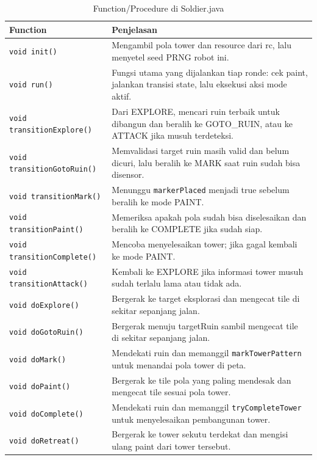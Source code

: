 \documentclass{article}
\begin{document}
\begin{enumerate}[label=\alph*.]
\begin{longtable}{|p{}|p{}|}
\caption{Function/Procedure di Soldier.java} \\
\hline
\textbf{Function} & \textbf{Penjelasan} \\
\hline
\endhead
\hline
\endfoot
\texttt{void init()} & Mengambil pola tower dan resource dari rc, lalu menyetel seed PRNG robot ini. \\
\hline
\texttt{void run()} & Fungsi utama yang dijalankan tiap ronde: cek paint, jalankan transisi state, lalu eksekusi aksi mode aktif. \\
\hline
\texttt{void transitionExplore()} & Dari EXPLORE, mencari ruin terbaik untuk dibangun dan beralih ke GOTO\_RUIN, atau ke ATTACK jika musuh terdeteksi. \\
\hline
\texttt{void transitionGotoRuin()} & Memvalidasi target ruin masih valid dan belum dicuri, lalu beralih ke MARK saat ruin sudah bisa disensor. \\
\hline
\texttt{void transitionMark()} & Menunggu \texttt{markerPlaced} menjadi true sebelum beralih ke mode PAINT. \\
\hline
\texttt{void transitionPaint()} & Memeriksa apakah pola sudah bisa diselesaikan dan beralih ke COMPLETE jika sudah siap. \\
\hline
\texttt{void transitionComplete()} & Mencoba menyelesaikan tower; jika gagal kembali ke mode PAINT. \\
\hline
\texttt{void transitionAttack()} & Kembali ke EXPLORE jika informasi tower musuh sudah terlalu lama atau tidak ada. \\
\hline
\texttt{void doExplore()} & Bergerak ke target eksplorasi dan mengecat tile di sekitar sepanjang jalan. \\
\hline
\texttt{void doGotoRuin()} & Bergerak menuju targetRuin sambil mengecat tile di sekitar sepanjang jalan. \\
\hline
\texttt{void doMark()} & Mendekati ruin dan memanggil \texttt{markTowerPattern} untuk menandai pola tower di peta. \\
\hline
\texttt{void doPaint()} & Bergerak ke tile pola yang paling mendesak dan mengecat tile sesuai pola tower. \\
\hline
\texttt{void doComplete()} & Mendekati ruin dan memanggil \texttt{tryCompleteTower} untuk menyelesaikan pembangunan tower. \\
\hline
\texttt{void doRetreat()} & Bergerak ke tower sekutu terdekat dan mengisi ulang paint dari tower tersebut. \\

\end{longtable}
\end{enumerate}
\end{document}
